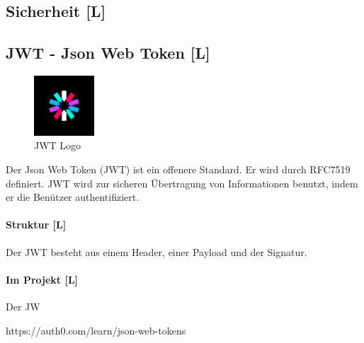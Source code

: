 \subsection{Sicherheit [L]}

\subsection{JWT - Json Web Token [L]}
\begin{figure}
  \begin{center}
    \includegraphics[width=0.2\textwidth]{pics/jwt_logo.png}
   \caption{JWT Logo}
  \end{center}
\end{figure}
Der Json Web Token (JWT) ist ein offenere Standard. Er wird durch RFC7519 definiert. JWT wird zur sicheren Übertragung von Informationen benutzt, indem er die Benützer authentifiziert. 

\paragraph{Struktur [L]}
Der JWT besteht aus einem Header, einer Payload und der Signatur. 

\paragraph{Im Projekt [L]}
Der JW


https://auth0.com/learn/json-web-tokens
